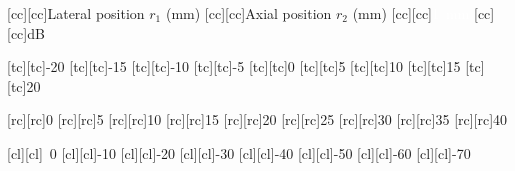 [cc][cc]{\footnotesize Lateral position $r_{1}$ (\si{\milli\meter})}
[cc][cc]{\footnotesize Axial position $r_{2}$ (\si{\milli\meter})}
[cc][cc]{\footnotesize \textcolor{white}{\SI{1}{\milli\meter}}}
[cc][cc]{\footnotesize \si{\deci\bel}}

[tc][tc]{\scriptsize -20}
[tc][tc]{\scriptsize -15}
[tc][tc]{\scriptsize -10}
[tc][tc]{\scriptsize -5}
[tc][tc]{\scriptsize 0}
[tc][tc]{\scriptsize 5}
[tc][tc]{\scriptsize 10}
[tc][tc]{\scriptsize 15}
[tc][tc]{\scriptsize 20}

[rc][rc]{\scriptsize 0}
[rc][rc]{\scriptsize 5}
[rc][rc]{\scriptsize 10}
[rc][rc]{\scriptsize 15}
[rc][rc]{\scriptsize 20}
[rc][rc]{\scriptsize 25}
[rc][rc]{\scriptsize 30}
[rc][rc]{\scriptsize 35}
[rc][rc]{\scriptsize 40}

[cl][cl]{\scriptsize ~0}
[cl][cl]{\scriptsize -10}
[cl][cl]{\scriptsize -20}
[cl][cl]{\scriptsize -30}
[cl][cl]{\scriptsize -40}
[cl][cl]{\scriptsize -50}
[cl][cl]{\scriptsize -60}
[cl][cl]{\scriptsize -70}


